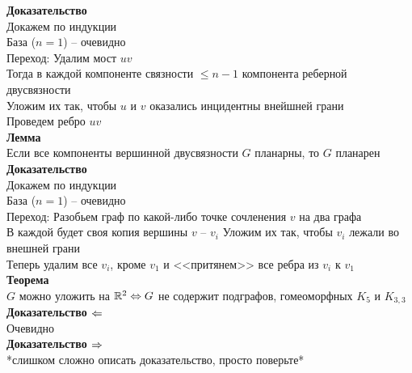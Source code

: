 \documentclass[12pt]{article}
\begin{document}
\textbf{Доказательство}\\
Докажем по индукции\\
База ($n=1$) -- очевидно\\
Переход: Удалим мост $uv$\\
Тогда в каждой компоненте связности $\leq n-1$ компонента реберной двусвязности\\
Уложим их так, чтобы $u$ и $v$ оказались инцидентны внейшней грани\\
Проведем ребро $uv$\\
\textbf{Лемма}\\
Если все компоненты вершинной двусвязности $G$ планарны, то $G$ планарен\\
\textbf{Доказательство}\\
Докажем по индукции\\
База ($n=1$) -- очевидно\\
Переход: Разобьем граф по какой-либо точке сочленения $v$ на два графа\\
В каждой будет своя копия вершины $v$ -- $v_i$
Уложим их так, чтобы $v_i$ лежали во внешней грани\\
Теперь удалим все $v_i$, кроме $v_1$ и <<притянем>> все ребра из $v_i$ к $v_1$\\
\textbf{Теорема}\\
$G$ можно уложить на $\mathbb{R}^2 \Leftrightarrow G$ не содержит подграфов, гомеоморфных $K_5$ и $K_{3,3}$\\
\textbf{Доказательство $\Leftarrow$}\\
Очевидно\\
\textbf{Доказательство $\Rightarrow$}\\
*слишком сложно описать доказательство, просто поверьте*\\
\end{document}
